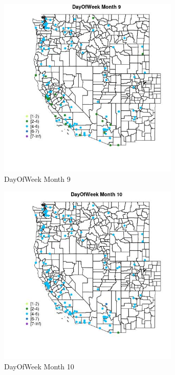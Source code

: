 \begin{figure} 
\centering  
\includegraphics[width=0.77\textwidth]{Code_Outputs/Report_ML_input_PM25_Step4_part_e_de_duplicated_aves_MapObsMo9DayOfWeek.jpg} 
\caption{\label{fig:Report_ML_input_PM25_Step4_part_e_de_duplicated_avesMapObsMo9DayOfWeek}DayOfWeek Month 9} 
\end{figure} 
 

\begin{figure} 
\centering  
\includegraphics[width=0.77\textwidth]{Code_Outputs/Report_ML_input_PM25_Step4_part_e_de_duplicated_aves_MapObsMo10DayOfWeek.jpg} 
\caption{\label{fig:Report_ML_input_PM25_Step4_part_e_de_duplicated_avesMapObsMo10DayOfWeek}DayOfWeek Month 10} 
\end{figure} 
 

